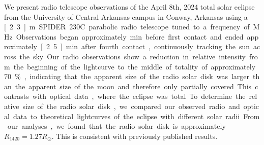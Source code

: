 We present radio telescope observations of the April 8th, 2024 total solar eclipse from the University of Central Arkansas campus in Conway, Arkansas using a \unit[2.3]{m} SPIDER 230C parabolic radio telescope tuned to a frequency of \unit[1420]{MHz}.
Observations began approximately \unit[19]{min} before first contact and ended approximately \unit[2.5]{min} after fourth contact, continuously tracking the sun across the sky.
Our radio observations show a reduction in relative intensity from the beginning of the lightcurve to the middle of totality of approximately 70\%, indicating that the apparent size of the radio solar disk was larger than the apparent size of the moon and therefore only partially covered.
This contrasts with optical data, where the eclipse was total.
To determine the relative size of the radio solar disk, we compared our observed radio and optical data to theoretical lightcurves of the eclipse with different solar radii.
From our analyses, we found that the radio solar disk is approximately $R_{\mathrm{1420}} = 1.27 R_{\odot}$.
This is consistent with previously published results.
